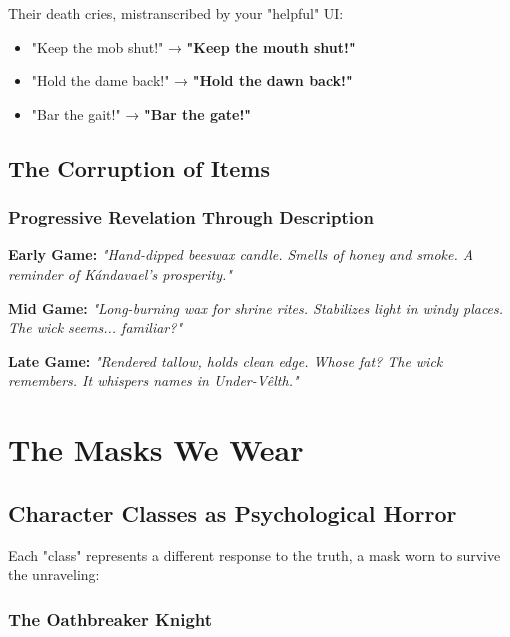 \documentclass[11pt,a4paper,twoside]{book}
\begin{document}
Their death cries, mistranscribed by your "helpful" UI:
\begin{itemize}
    \item "Keep the mob shut!" → \textbf{"Keep the mouth shut!"}
    \item "Hold the dame back!" → \textbf{"Hold the dawn back!"}
    \item "Bar the gait!" → \textbf{"Bar the gate!"}
\end{itemize}

\section{The Corruption of Items}

\subsection{Progressive Revelation Through Description}

\begin{tcolorbox}[itembox={Festival Candle}]
\textbf{Early Game:} \textit{"Hand-dipped beeswax candle. Smells of honey and smoke. A reminder of Kándavael's prosperity."}
\end{tcolorbox}

\begin{tcolorbox}[itembox={Festival Candle}]
\textbf{Mid Game:} \textit{"Long-burning wax for shrine rites. Stabilizes light in windy places. The wick seems... familiar?"}
\end{tcolorbox}

\begin{tcolorbox}[horrorbox={Festival Candle}]
\textbf{Late Game:} \textit{"Rendered tallow, holds clean edge. Whose fat? The wick remembers. It whispers names in Under-Vêlth."}
\end{tcolorbox}

\chapter{The Masks We Wear}

\section{Character Classes as Psychological Horror}

Each "class" represents a different response to the truth, a mask worn to survive the unraveling:

\subsection{The Oathbreaker Knight}
\end{document}
